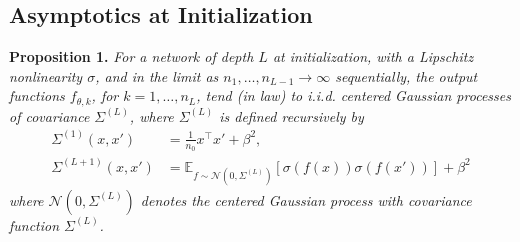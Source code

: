 \documentclass[10pt]{article}
\newcommand{\EE}{\mathbb{E}}
\newcommand{\NN}{\mathcal{N}}
\newcommand{\paran}[1]{{( #1 )}}
\begin{document}
\subsection{Asymptotics at Initialization}

\textbf{Proposition 1.} \textit{For a network of depth $L$ at initialization, with a Lipschitz nonlinearity $\sigma$, and in the limit as $n_1, \ldots, n_{L - 1} \rightarrow \infty$ sequentially, the output functions $f_{\theta,k}$, for $k = 1, \ldots, n_L$, tend (in law) to i.i.d. centered Gaussian processes of covariance $\Sigma^\paran{L}$, where $\Sigma^\paran{L}$ is defined recursively by
\begin{align*}
\Sigma^\paran{1}(x,x') &= \frac{1}{n_0} x^\top x' + \beta^2, \\
\Sigma^\paran{L + 1}(x,x') &= \EE_{f \sim \NN(0,\Sigma^\paran{L})} [\sigma(f(x)) \sigma(f(x'))] + \beta^2
\end{align*}
where $\NN(0,\Sigma^\paran{L})$ denotes the centered Gaussian process with covariance function $\Sigma^\paran{L}$.}
\end{document}
